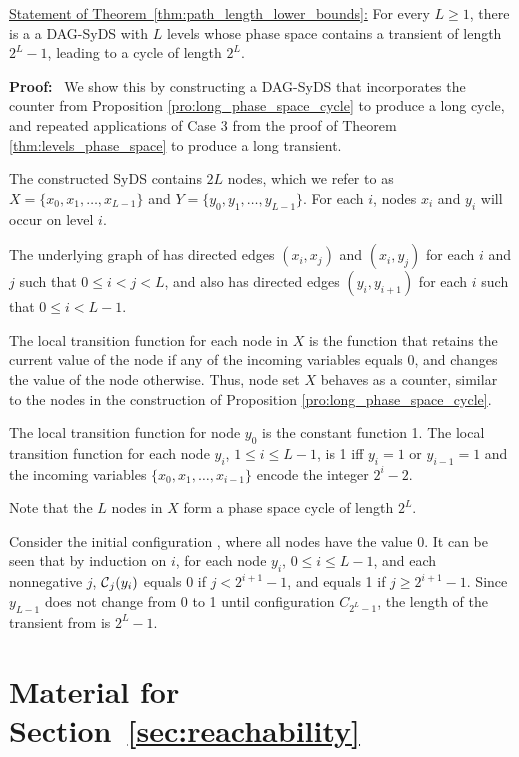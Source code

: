 \medskip

\noindent
\underline{Statement of Theorem~\ref{thm:path_length_lower_bounds}:}
For every $L  \geq 1$,
there is a a DAG-SyDS with $L$ levels
whose phase space contains a transient of length $2^L-1$,
leading to a cycle of length $2^L$.

\medskip

\noindent
\textbf{Proof:}~ 
We show this by constructing a DAG-SyDS that
incorporates the counter from Proposition \ref{pro:long_phase_space_cycle}
to produce a long cycle, and repeated applications of Case 3 from
the proof of Theorem \ref{thm:levels_phase_space} to produce a long
transient.

The constructed SyDS \cals{}  contains
$2L$ nodes, which we refer to as $X = \{x_0, x_1, \dots , x_{L-1}\}$ 
and $Y = \{y_0, y_1, \dots , y_{L-1}\}$.
For each $i$, nodes $x_i$ and $y_i$ will occur on level $i$.

The underlying graph of \cals{} has directed edges
$(x_i, x_j)$  and $(x_i, y_j)$ for each $i$ and $j$  such that $0 \leq i < j  < L$,
and also has directed edges $(y_i, y_{i+1})$ for each $i$ such that $0 \leq i < L-1$.

The local transition function for each node in $X$ is the function 
that retains the current value of the node if any of the incoming variables equals 0,
and changes the value of the node otherwise.
Thus, node set $X$ behaves as a counter,
similar to the nodes in the construction of 
Proposition \ref{pro:long_phase_space_cycle}.

The local transition function for node $y_0$ is the constant function
1.  The local transition function for each node $y_i$, $1 \leq i
\leq L-1$, is 1 iff $y_i = 1$ or $y_{i-1} = 1$ and the incoming
variables $\{x_0, x_1, \dots , x_{i-1}\}$ encode the integer $2^i-2$.

Note that the $L$ nodes in $X$ form a phase space cycle of length $2^L$.

Consider the initial configuration \calc{}, where all nodes have the value 0.
It can be seen that by induction on $i$, for each node $y_i$, $0 \leq i \leq L-1$,
and each nonnegative $j$, 
$\mbox{$\mathcal{C}$}_j(y_i)$ equals 0 if $j < 2^{i+1} -1$, and equals 1 if $j \geq 2^{i+1} -1$.
Since $y_{L-1}$ does not change from 0 to 1 until configuration $C_{2^L-1}$, 
the length of the transient from \calc{} is $2^L-1$.
\QED

\bigskip


\section{Material for Section~\ref{sec:reachability}}
\label{asec:reach}

